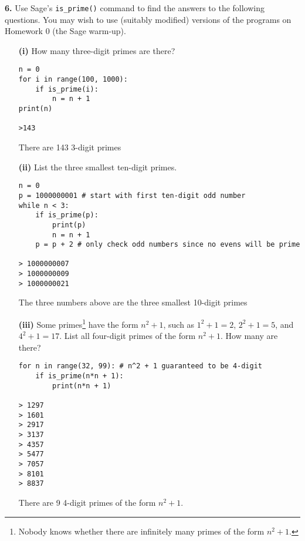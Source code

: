 \documentclass[12pt]{amsart}
\begin{document}
{\bf 6.}  Use Sage's {\tt is\_prime()} command to find the answers to the following questions.  You may wish to use (suitably modified) versions of the programs on Homework 0 (the Sage warm-up).  
 \smallskip
\begin{itemize}
\item[{\bf (i)}] How many three-digit primes are there?

\medskip

\begin{verbatim}
n = 0
for i in range(100, 1000): 
    if is_prime(i): 
        n = n + 1
print(n)

>143
\end{verbatim}
There are 143 3-digit primes
\medskip

\item[{\bf (ii)}] List the three smallest ten-digit primes. 
\medskip
\begin{verbatim}
n = 0
p = 1000000001 # start with first ten-digit odd number
while n < 3:
    if is_prime(p): 
        print(p)
        n = n + 1
    p = p + 2 # only check odd numbers since no evens will be prime
    
> 1000000007
> 1000000009
> 1000000021
\end{verbatim}
The three numbers above are the three smallest 10-digit primes
\medskip 
\item[{\bf (iii)}] Some primes\footnote{Nobody knows whether there are infinitely many primes of the form $n^2+1$.} have the form $n^2+1$, such as $1^2+1=2$, $2^2+1=5$, and $4^2+1=17$.  List all four-digit primes of the form $n^2+1$.  How many are there?
\medskip
\begin{verbatim}
for n in range(32, 99): # n^2 + 1 guaranteed to be 4-digit
    if is_prime(n*n + 1):
        print(n*n + 1)
        
> 1297
> 1601
> 2917
> 3137
> 4357
> 5477
> 7057
> 8101
> 8837
\end{verbatim}
There are 9 4-digit primes of the form $n^2 + 1$.


\end{itemize}   

\medskip
\end{document}
